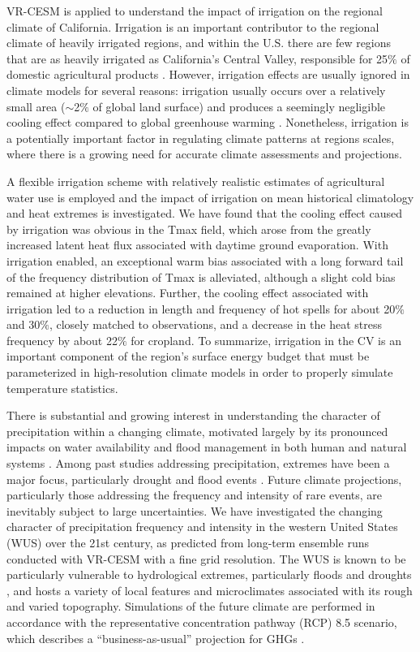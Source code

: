 VR-CESM is applied to understand the impact of irrigation on the regional climate of California. Irrigation is an important contributor to the regional climate of heavily irrigated regions, and within the U.S. there are few regions that are as heavily irrigated as California's Central Valley, responsible for 25$\%$ of domestic agricultural products \cite{wilkinson2002potential}. However, irrigation effects are usually ignored in climate models for several reasons: irrigation usually occurs over a relatively small area ($\sim$2$\%$ of global land surface) and produces a seemingly negligible cooling effect compared to global greenhouse warming \cite{boucher2004direct}. Nonetheless, irrigation is a potentially important factor in regulating climate patterns at regions scales, where there is a growing need for accurate climate assessments and projections.

A flexible irrigation scheme with relatively realistic estimates of agricultural water use is employed and the impact of irrigation on mean historical climatology and heat extremes is investigated. We have found that the cooling effect caused by irrigation was obvious in the Tmax field, which arose from the greatly increased latent heat flux associated with daytime ground evaporation. With irrigation enabled, an exceptional warm bias associated with a long forward tail of the frequency distribution of Tmax is alleviated, although a slight cold bias remained at higher elevations. Further, the cooling effect associated with irrigation led to a reduction in length and frequency of hot spells for about 20$\%$ and 30$\%$, closely matched to observations, and a decrease in the heat stress frequency by about 22$\%$ for cropland. To summarize, irrigation in the CV is an important component of the region's surface energy budget that must be parameterized in high-resolution climate models in order to properly simulate temperature statistics.

There is substantial and growing interest in understanding the character of precipitation within a changing climate, motivated largely by its pronounced impacts on water availability and flood management in both human and natural systems \cite{hegerl2004detectability, kharin2007changes, scoccimarro2013heavy}. Among past studies addressing precipitation, extremes have been a major focus, particularly drought and flood events \cite{seneviratne2012changes}. Future climate projections, particularly those addressing the frequency and intensity of rare events, are inevitably subject to large uncertainties. We have investigated the changing character of precipitation frequency and intensity in the western United States (WUS) over the 21st century, as predicted from long-term ensemble runs conducted with VR-CESM with a fine grid resolution. The WUS is known to be particularly vulnerable to hydrological extremes, particularly floods and droughts \cite{leung2003hydroclimate, caldwell2010california}, and hosts a variety of local features and microclimates associated with its rough and varied topography.  Simulations of the future climate are performed in accordance with the representative concentration pathway (RCP) 8.5 scenario, which describes a ``business-as-usual'' projection for GHGs \cite{riahi2011rcp}.

